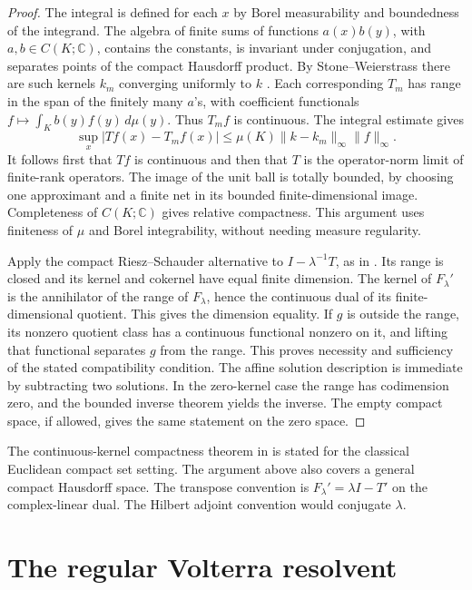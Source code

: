 \documentclass[11pt,oneside,openany]{book}
\theoremstyle{plain}
\theoremstyle{definition}
\theoremstyle{remark}
\begin{document}
\begin{proof}
The integral is defined for each \(x\) by Borel measurability and
boundedness of the integrand. The algebra of finite sums of
functions \(a(x)b(y)\), with \(a,b\in C(K;\mathbb C)\), contains
the constants, is invariant under conjugation, and separates
points of the compact Hausdorff product. By Stone--Weierstrass
there are such kernels \(k_m\) converging uniformly to \(k\)
\cite[Unit U1]{P102}. Each corresponding \(T_m\) has range
in the span of the finitely many \(a\)'s, with coefficient
functionals \(f\mapsto\int_K b(y)f(y)\,d\mu(y)\).
Thus \(T_m f\) is continuous. The integral estimate gives
\[
 \sup_x|Tf(x)-T_m f(x)|\leq
       \mu(K)\|k-k_m\|_\infty\|f\|_\infty .
\]
It follows first that \(Tf\) is continuous and then that \(T\)
is the operator-norm limit of finite-rank operators. The image
of the unit ball is totally bounded, by choosing one approximant
and a finite net in its bounded finite-dimensional image.
Completeness of \(C(K;\mathbb C)\) gives relative compactness.
This argument uses finiteness of \(\mu\) and Borel integrability,
without needing measure regularity.

Apply the compact Riesz--Schauder alternative to
\(I-\lambda^{-1}T\), as in \cite[Part II, compact operators]{D16}.
Its range is closed and its kernel and cokernel have equal finite
dimension. The kernel of \(F_\lambda'\) is the annihilator of
the range of \(F_\lambda\), hence the continuous dual of its
finite-dimensional quotient. This gives the dimension equality.
If \(g\) is outside the range, its nonzero quotient class has a
continuous functional nonzero on it, and lifting that functional
separates \(g\) from the range. This proves necessity and
sufficiency of the stated compatibility condition. The affine
solution description is immediate by subtracting two solutions.
In the zero-kernel case the range has codimension zero, and the
bounded inverse theorem yields the inverse. The empty compact
space, if allowed, gives the same statement on the zero space.
\end{proof}

The continuous-kernel compactness theorem in
\cite[Section 2.5, Theorem 2.27]{Kress} is stated for the classical
Euclidean compact set setting. The argument above also covers a
general compact Hausdorff space. The transpose convention is
\(F_\lambda'=\lambda I-T'\) on the complex-linear dual.
The Hilbert adjoint convention would conjugate \(\lambda\).

\section{The regular Volterra resolvent}\label{pde:I02}
\end{document}
